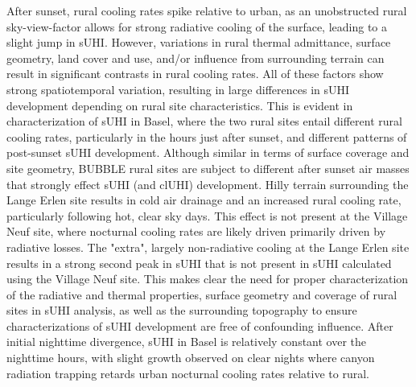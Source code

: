 \begin{bibunit}
After sunset, rural cooling rates spike relative to urban, as an unobstructed rural sky-view-factor allows for strong radiative cooling of the surface, leading to a slight jump in sUHI.  However, variations in rural thermal admittance, surface geometry, land cover and use, and/or influence from surrounding terrain can result in significant contrasts in rural cooling rates. All of these factors show strong spatiotemporal variation, resulting in large differences in sUHI development depending on rural site characteristics. This is evident in characterization of sUHI in Basel, where the two rural sites entail different rural cooling rates, particularly in the hours just after sunset, and different patterns of post-sunset sUHI development. Although similar in terms of surface coverage and site geometry, BUBBLE rural sites are subject to different after sunset air masses that strongly effect sUHI (and clUHI) development. Hilly terrain surrounding the Lange Erlen site results in cold air drainage and an increased rural cooling rate, particularly following hot, clear sky days. This effect is not present at the Village Neuf site, where nocturnal cooling rates are likely driven primarily driven by radiative losses. The "extra", largely non-radiative cooling at the Lange Erlen site results in a strong second peak in sUHI that is not present in sUHI calculated using the Village Neuf site. This makes clear the need for proper characterization of the radiative and thermal properties, surface geometry and coverage of rural sites in sUHI analysis, as well as the surrounding topography to ensure characterizations of sUHI development are free of confounding influence. After initial nighttime divergence, sUHI in Basel is relatively constant over the nighttime hours, with slight growth observed on clear nights where canyon radiation trapping retards urban nocturnal cooling rates relative to rural. 



\end{bibunit}
